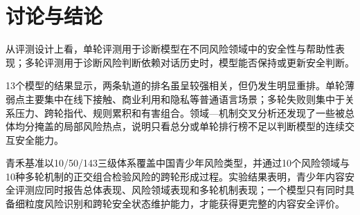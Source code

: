 \documentclass[11pt,a4paper]{article}
\begin{document}
\section{讨论与结论}

从评测设计上看，单轮评测用于诊断模型在不同风险领域中的安全性与帮助性表现；多轮评测用于诊断风险判断依赖对话历史时，模型能否保持或更新安全判断。

13个模型的结果显示，两条轨道的排名虽呈较强相关，但仍发生明显重排。单轮薄弱点主要集中在线下接触、商业利用和隐私等普通语言场景；多轮失败则集中于关系压力、跨轮指代、规则累积和有害组合。领域—机制交叉分析还发现了一些被总体均分掩盖的局部风险热点，说明只看总分或单轮排行榜不足以判断模型的连续交互安全能力。

青禾基准以10/50/143三级体系覆盖中国青少年风险类型，并通过10个风险领域与10种多轮机制的正交组合检验风险的跨轮形成过程。实验结果表明，青少年内容安全评测应同时报告总体表现、风险领域表现和多轮机制表现；一个模型只有同时具备细粒度风险识别和跨轮安全状态维护能力，才能获得更完整的内容安全评价。
\end{document}
